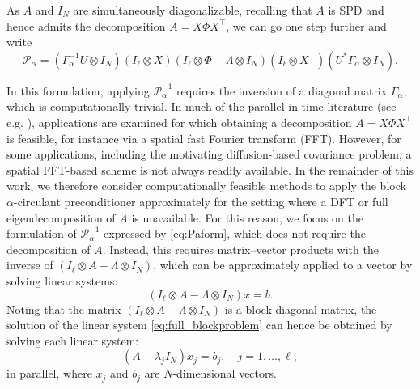 \documentclass{article}
\newcommand{\sizeA}{N}
\theoremstyle{definition}
\begin{document}
{		As $A$ and $I_\sizeA$ are simultaneously diagonalizable, recalling that $A$ is SPD and hence admits the decomposition ${A} = X\Phi X^\top$, we can go one step further and write
		\begin{equation*}
			\mathcal{P}_{\alpha} 
			= (\Gamma_{\alpha}^{-1}U\otimes I_\sizeA)(I_{\ell}\otimes X)(I_{\ell}\otimes\Phi  - \Lambda \otimes I_\sizeA)(I_{\ell} \otimes X^\top)(U^*\Gamma_{\alpha}\otimes I_\sizeA).
		\end{equation*}
		
		In this formulation, applying $\mathcal{P}_{\alpha}^{-1}$ requires the inversion of a diagonal matrix $\Gamma_{\alpha}$, which is computationally trivial. 
		In much of the parallel-in-time literature (see e.g. \cite{hon_sine_2024,li_preconditioned_2024,mcdonald2018preconditioning,StollM2014Osoa}), applications are examined for which obtaining a decomposition ${A} = X\Phi X^{\top}$ is feasible, for instance via a spatial fast Fourier transform (FFT).
		However, for some applications, including the motivating diffusion-based covariance problem,  a spatial FFT-based scheme is not always readily available. 
		In the remainder of this work, we therefore consider computationally feasible methods to apply the block $\alpha$-circulant preconditioner approximately for the setting where a DFT or full eigendecomposition of ${A}$ is unavailable. {For this reason, we focus on the formulation of $\mathcal{P}_{\alpha}^{-1}$ expressed by \eqref{eq:Paform}, which does not require the decomposition of $A$. Instead, this requires matrix--vector products with the inverse of $(I_{\ell}\otimes {A} - \Lambda \otimes I_\sizeA)$, which can be approximately applied to a vector by  solving linear systems:}
		\begin{equation}
			\label{eq:full_blockproblem}
			(I_{\ell}\otimes {A} - \Lambda \otimes I_\sizeA)x = b.
		\end{equation}
		{Noting that the matrix $(I_{\ell}\otimes {A} - \Lambda \otimes I_\sizeA)$ is a block diagonal matrix, the solution of the linear system \eqref{eq:full_blockproblem} can hence be obtained by solving each linear system:
			\begin{equation}
				\label{eq:blockproblem}
				({A} - \lambda_j I_\sizeA) x_j = b_j, \quad j = 1,\dots, \ell,
			\end{equation}
			in parallel, where $x_j$ and $b_j$ are $N$-dimensional vectors.}
		
		
		
		
		
}
\end{document}
